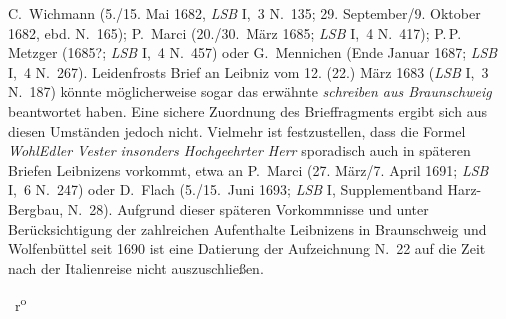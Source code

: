 \begin{ledgroup}
%
C.~Wichmann
(5./15. Mai 1682, \textit{LSB} I,~3 N.~135;\cite{01328}
29. September/9. Oktober 1682, ebd. N.~165);\cite{01329}%
\protect{}
%
P.~Marci
(20./30.~März 1685; \textit{LSB} I,~4 N.~417);\cite{01330}%
\protect{}
%
P.\,P. Metzger
(1685?; \textit{LSB} I,~4 N.~457)\cite{01331}%
\protect{}
%
oder G.~Mennichen
(Ende Januar 1687; \textit{LSB} I,~4 N.~267).\cite{01332}%
\protect{}
%
Leidenfrosts Brief an Leibniz vom 12. (22.) März 1683 (\textit{LSB} I,~3 N.~187)\cite{01333}
könnte möglicherweise sogar das erwähnte \textit{schreiben aus Braunschweig} beantwortet haben.
Eine sichere Zuordnung des Brieffragments ergibt sich aus diesen Umständen jedoch nicht.
Vielmehr ist festzustellen, dass die Formel \textit{WohlEdler Vester insonders Hochgeehrter Herr} 
sporadisch auch in späteren Briefen Leibnizens vorkommt,
etwa an P.~Marci (27. März/7. April 1691; \textit{LSB} I,~6 N.~247)\cite{01334}
oder D.~Flach (5./15.~Juni 1693; \textit{LSB} I, Supplementband Harz-Bergbau, N.~28).\cite{01335}%
\protect{}
%
Aufgrund dieser späteren Vorkommnisse und unter Berücksichtigung der zahlreichen Aufenthalte Leibnizens in Braunschweig\protect{} und Wolfenbüttel\protect{} seit 1690 ist eine Datierung der Aufzeichnung N.~22 auf die Zeit nach der Italienreise nicht auszuschließen.
\pend
\end{ledgroup}
%
%
\frenchspacing%
%
%
\newpage%
\pstart%
\noindent%
\normalsize%
%
%
%
%
~r\textsuperscript{o}\rbrack\ %
%
